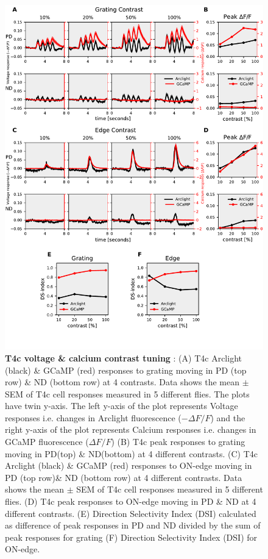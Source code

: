 \documentclass[9pt,lineno]{elife}
\begin{document}
\begin{figure}
\begin{fullwidth}
\includegraphics[width=0.84\linewidth]{figure2}
\caption{\textbf{T4c voltage \& calcium contrast tuning} : (A) T4c Arclight (black) \& GCaMP (red) responses to grating moving in PD (top row) \& ND (bottom row) at 4 contrasts. Data shows the mean $\pm$ SEM of T4c cell responses measured in 5 different flies. The plots have twin y-axis. The left y-axis of the plot represents Voltage responses i.e. changes in Arclight fluorescence ($-\Delta F/F$) and the right y-axis of the plot represents Calcium responses i.e. changes in GCaMP fluorescence ($\Delta F/F$) (B) T4c peak responses to grating moving in PD(top) \& ND(bottom) at 4 different contrasts. (C) T4c Arclight (black) \& GCaMP (red) responses to ON-edge moving in PD (top row)\& ND (bottom row) at 4 different contrasts. Data shows the mean $\pm$ SEM of T4c cell responses measured in 5 different flies. (D) T4c peak responses to ON-edge moving in PD \& ND at 4 different contrasts. (E) Direction Selectivity Index (DSI) calculated as difference of peak responses in PD and ND divided by the sum of peak responses for grating (F) Direction Selectivity Index (DSI) for ON-edge.}

\label{PDNDcontrast}
	
\end{fullwidth}
\end{figure} 
\end{document}
